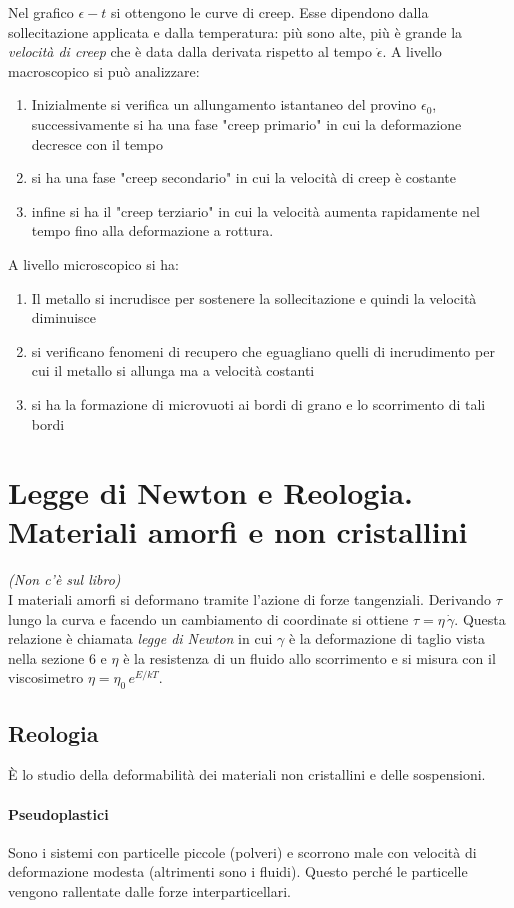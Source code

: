 \documentclass[a5paper,12pt]{article}
\newcommand{\e}{\`E\xspace}  %
\begin{document}
Nel grafico $\epsilon-t$ si ottengono le curve di creep. Esse dipendono dalla sollecitazione applicata e dalla temperatura: più sono alte, più è grande la \emph{velocità di creep} che è data dalla derivata rispetto al tempo $\dot{\epsilon}$. A livello macroscopico si può analizzare:
\begin{enumerate}
	\item Inizialmente si verifica un allungamento istantaneo del provino $\epsilon_0$, successivamente si ha una fase "creep primario" in cui la deformazione decresce con il tempo
	\item si ha una fase "creep secondario" in cui la velocità di creep è costante
	\item infine si ha il "creep terziario" in cui la velocità aumenta rapidamente nel tempo fino alla deformazione a rottura.
\end{enumerate}
A livello microscopico si ha:
\begin{enumerate}
	\item Il metallo si incrudisce per sostenere la sollecitazione e quindi la velocità diminuisce
	\item si verificano fenomeni di recupero che eguagliano quelli di incrudimento per cui il metallo si allunga ma a velocità costanti 
	\item si ha la formazione di microvuoti ai bordi di grano e lo scorrimento di tali bordi
\end{enumerate}
\section{Legge di Newton e Reologia. Materiali amorfi e non cristallini}
\textit{(Non c'è sul libro)}\\
I materiali amorfi si deformano tramite l'azione di forze tangenziali. Derivando $\tau$ lungo la curva e facendo un cambiamento di coordinate si ottiene $\tau = \eta \, \dot{\gamma}$. Questa relazione è chiamata \emph{legge di Newton} in cui $\gamma$ è la deformazione di taglio vista nella sezione 6 e $\eta$ è la resistenza di un fluido allo scorrimento e si misura con il viscosimetro $\eta = \eta_0 \, e^{E/kT}$.
\subsection{Reologia}
\e lo studio della deformabilità dei materiali non cristallini e delle sospensioni. 
\paragraph{Pseudoplastici} Sono i sistemi con particelle piccole (polveri) e scorrono male con velocità di deformazione modesta (altrimenti sono i fluidi). Questo perché le particelle vengono rallentate dalle forze interparticellari.
\end{document}
